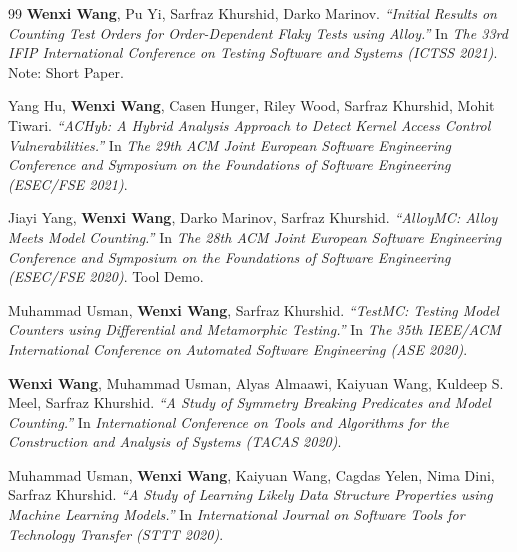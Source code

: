 \begin{thebibliography}{99}
	\textbf{Wenxi Wang}, Pu Yi, Sarfraz Khurshid, Darko Marinov.
	\emph{``Initial Results on Counting Test Orders for Order-Dependent Flaky Tests using Alloy.''}
	In \textit{The 33rd IFIP International Conference on Testing Software and Systems (ICTSS 2021)}.
	Note: Short Paper. \href{https://wenxiwang.github.io/papers/ictss2021.pdf}{\color{color1}{\textbf{[PDF]}}}
	
	Yang Hu, \textbf{Wenxi Wang}, Casen Hunger, Riley Wood, Sarfraz Khurshid, Mohit Tiwari.
	\emph{``ACHyb: A Hybrid Analysis Approach to Detect Kernel Access Control Vulnerabilities.''}
	In \textit{The 29th ACM Joint European Software Engineering Conference and Symposium on the Foundations of Software Engineering (ESEC/FSE 2021)}. \href{https://wenxiwang.github.io/papers/ACHyb.pdf}{\color{color1}{\textbf{[PDF]}}}
	
	Jiayi Yang, \textbf{Wenxi Wang}, Darko Marinov, Sarfraz Khurshid.
	\emph{``AlloyMC: Alloy Meets Model Counting.''}
	In \textit{The 28th ACM Joint European Software Engineering Conference and Symposium on the Foundations of Software Engineering (ESEC/FSE 2020)}. Tool Demo. \href{https://wenxiwang.github.io/papers/AlloyMC.pdf}{\color{color1}{\textbf{[PDF]}}}
	
	Muhammad Usman, \textbf{Wenxi Wang}, Sarfraz Khurshid.
	\emph{``TestMC: Testing Model Counters using Differential and
		Metamorphic Testing.''}
	In \textit{The 35th IEEE/ACM International Conference on Automated Software Engineering (ASE 2020)}. \href{https://wenxiwang.github.io/papers/TestMC.pdf}{\color{color1}{\textbf{[PDF]}}}
	
	\textbf{Wenxi Wang}, Muhammad Usman, Alyas Almaawi, Kaiyuan Wang, Kuldeep S. Meel, Sarfraz Khurshid.
	\emph{``A Study of Symmetry Breaking Predicates and Model Counting.''}
	In \textit{International Conference on Tools and Algorithms for the Construction and Analysis of Systems (TACAS 2020)}. \href{https://wenxiwang.github.io/papers/symmetry_study.pdf}{\color{color1}{\textbf{[PDF]}}}
	
	Muhammad Usman, \textbf{Wenxi Wang}, Kaiyuan Wang, Cagdas Yelen, Nima Dini, Sarfraz Khurshid.
	\emph{``A Study of Learning Likely Data Structure Properties using Machine Learning Models.''}
	In \textit{International Journal on Software Tools for Technology Transfer (STTT 2020)}. \href{https://wenxiwang.github.io/papers/sttt2020.pdf}{\color{color1}{\textbf{[PDF]}}}
	

\end{thebibliography}
